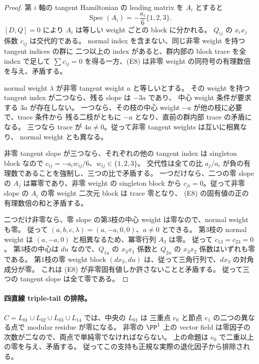 \begin{proof}
第 $i$ 軸の tangent Hamiltonian の leading matrix を $A_i$ とすると
\[
 \operatorname{Spec}(A_i)=-\frac{a_i}{6}\{1,2,3\}.
 \tag{E8}
\]
$[D,Q]=0$ により $A_i$ は等しい weight ごとの block に分かれる。
$Q_{ij}$ の $x_ix_j$ 係数 $c_{ij}$ は交代的である。
normal index を含まない、同じ非零 weight を持つ tangent indices の群に
二つ以上の index があると、群内部の block trace を全 index で足して
$\sum c_{ij}=0$ を得る一方、(E8) は非零 weight の同符号の有理数倍を与え、矛盾する。

normal weight $\lambda$ が非零 tangent weight $a$ と等しいとする。
その weight を持つ tangent index が二つなら、残る slope は $-3a$ であり、
中心 weight 条件が要求する $3a$ が存在しない。
一つなら、その枝の中心 weight $-a$ が他の枝に必要で、trace 条件から
残る二枝がともに $-a$ となり、直前の群内部 trace の矛盾になる。
三つなら trace が $4a\ne0$。従って非零 tangent weights は互いに相異なり、
normal weight とも異なる。

非零 tangent slope が三つなら、それぞれの他の tangent index は singleton block
なので $c_{ij}=-a_iw_{ij}/6$、$w_{ij}\in\{1,2,3\}$。
交代性は全ての比 $a_j/a_i$ が負の有理数であることを強制し、三つの比で矛盾する。
一つだけなら、二つの零 slope の $A_j$ は冪零であり、非零 weight の singleton block
から $c_{ji}=0$。従って非零 slope の $A_i$ の零 weight 二次元 block は trace 零となり、
(E8) の固有値の正の有理数倍の和と矛盾する。

二つだけ非零なら、零 slope の第3枝の中心 weight は零なので、normal weight も零。
従って $(a,b,c,\lambda)=(a,-a,0,0)$、$a\ne0$ とできる。
第3枝の normal weight は $(a,-a,0)$ と相異なるため、冪零行列 $A_3$ は零。
従って $c_{13}=c_{23}=0$。
第3枝の中心は $du$ なので、$Q_{1u}$ の $x_3x_1$ 係数と
$Q_{2u}$ の $x_3x_2$ 係数はいずれも零である。
第1枝の零 weight block $(dx_3,du)$ は、従って三角行列で、$dx_3$ の対角成分が零。
これは (E8) が非零固有値しか許さないことと矛盾する。
従って三つの tangent slope は全て零である。
\end{proof}

\paragraph{四直線 triple-tail の排除。}
$C=L_{01}\cup L_{02}\cup L_{03}\cup L_{14}$ では、中央の $L_{01}$ は
三重点 $e_0$ と節点 $e_1$ の二つの異なる点で modular residue が零になる。
非零の $\PP^1$ 上の vector field は零因子の次数が二なので、両点で単純零でなければならない。
上の命題は $e_0$ で二重以上の零を与え、矛盾する。
従ってこの支持も正規な実際の退化因子から排除される。
